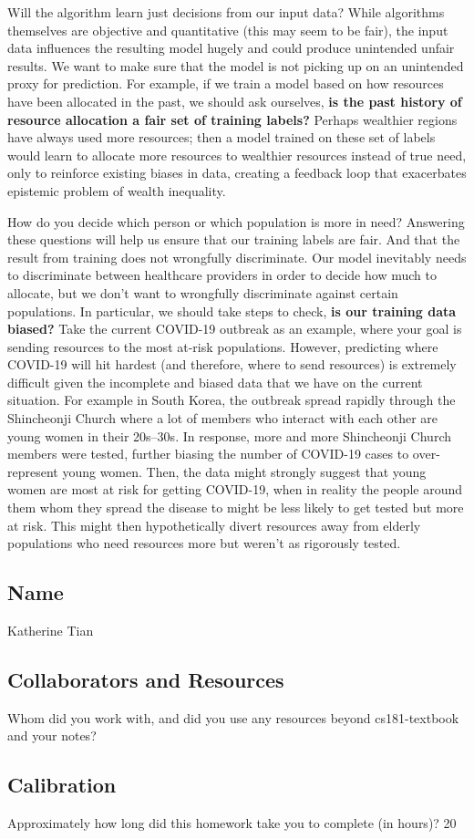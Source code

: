 \documentclass[submit]{harvardml}
\begin{document}
Will the algorithm learn just decisions from our input data? While algorithms themselves are objective and quantitative (this may seem to be fair), the input data influences the resulting model hugely and could produce unintended unfair results. We want to make sure that the model is not picking up on an unintended proxy for prediction. For example, if we train a model based on how resources have been allocated in the past, we should ask ourselves, \textbf{is the past history of resource allocation a fair set of training labels?} Perhaps wealthier regions have always used more resources; then a model trained on these set of labels would learn to allocate more resources to wealthier resources instead of true need, only to reinforce existing biases in data, creating a feedback loop that exacerbates epistemic problem of wealth inequality. 

How do you decide which person or which population is more in need? Answering these questions will help us ensure that our training labels are fair. And that the result from training does not wrongfully discriminate. Our model inevitably needs to discriminate between healthcare providers in order to decide how much to allocate, but we don’t want to wrongfully discriminate against certain populations. In particular, we should take steps to check, \textbf{is our training data biased?} Take the current COVID-19 outbreak as an example, where your goal is sending resources to the most at-risk populations. However, predicting where COVID-19 will hit hardest (and therefore, where to send resources) is extremely difficult given the incomplete and biased data that we have on the current situation. For example in South Korea, the outbreak spread rapidly through the Shincheonji Church where a lot of members who interact with each other are young women in their 20s–30s. In response, more and more Shincheonji Church members were tested, further biasing the number of COVID-19 cases to over-represent young women. Then, the data might strongly suggest that young women are most at risk for getting COVID-19, when in reality the people around them whom they spread the disease to might be less likely to get tested but more at risk. This might then hypothetically divert resources away from elderly populations who need resources more but weren't as rigorously tested.


\newpage
\subsection*{Name}
Katherine Tian

\subsection*{Collaborators and Resources}
Whom did you work with, and did you use any resources beyond cs181-textbook and your notes?

\subsection*{Calibration}
Approximately how long did this homework take you to complete (in hours)? 
20
\end{document}
